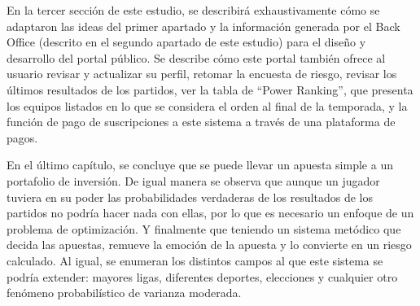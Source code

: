 En la tercer sección de este estudio, se describirá exhaustivamente cómo se adaptaron las ideas del primer apartado y la información generada por el Back Office (descrito en el segundo apartado de este estudio) para el diseño y desarrollo del portal público. Se describe cómo este portal también ofrece al usuario revisar y actualizar su perfil, retomar la encuesta de riesgo, revisar los últimos resultados de los partidos, ver la tabla de ``Power Ranking'', que presenta los equipos listados en lo que se considera el orden al final de la temporada, y la función de pago de suscripciones a este sistema a través de una plataforma de pagos.


En el último capítulo, se concluye que se puede llevar un apuesta simple a un portafolio de inversión. De igual manera se observa que aunque un jugador tuviera en su poder las probabilidades verdaderas de los resultados de los partidos no podría hacer nada con ellas, por lo que es necesario un enfoque de un problema de optimización. Y finalmente que teniendo un sistema metódico que decida las apuestas, remueve la emoción de la apuesta y lo convierte en un riesgo calculado. Al igual, se enumeran los distintos campos al que este sistema se podría extender: mayores ligas, diferentes deportes, elecciones y cualquier otro fenómeno probabilístico de varianza moderada.

